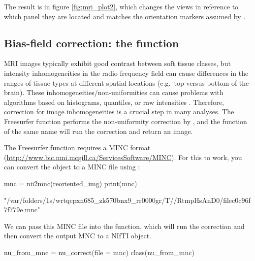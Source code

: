 The result is in figure \ref{fig:mri_plot2}, which changes the views in
reference to which panel they are located and matches the orientation
markers assumed by .

\subsection{\texorpdfstring{Bias-field correction: the
function}{Bias-field correction: the  function}}\label{bias-field-correction-the-function}

MRI images typically exhibit good contrast between soft tissue classes,
but intensity inhomogeneities in the radio frequency field can cause
differences in the ranges of tissue types at different spatial locations
(e.g.~top versus bottom of the brain). These
inhomogeneities/non-uniformities can cause problems with algorithms
based on histograms, quantiles, or raw intensities
\citep{zhang_segmentation_2001}. Therefore, correction for image
inhomogeneities is a crucial step in many analyses. The Freesurfer
function  performs the non-uniformity correction by
\citet{sled_nonparametric_1998}, and the  function of
the same name will run the correction and return an image.

The Freesurfer  function requires a MINC format
(\url{http://www.bic.mni.mcgill.ca/ServicesSoftware/MINC}). For this to
work, you can convert the  object to a MINC file using
:

\begin{Schunk}
\begin{Sinput}
mnc = nii2mnc(reoriented_img)
print(mnc)
\end{Sinput}
\begin{Soutput}
[1] "/var/folders/1s/wrtqcpxn685_zk570bnx9_rr0000gr/T//RtmpHsAnD0/filec0c96f7f779e.mnc"
\end{Soutput}
\end{Schunk}

We can pass this MINC file into the  
function, which will run the correction and then convert the output MNC
to a NIfTI object.

\begin{Schunk}
\begin{Sinput}
nu_from_mnc = nu_correct(file = mnc)
class(nu_from_mnc)
\end{Sinput}
\end{Schunk}

